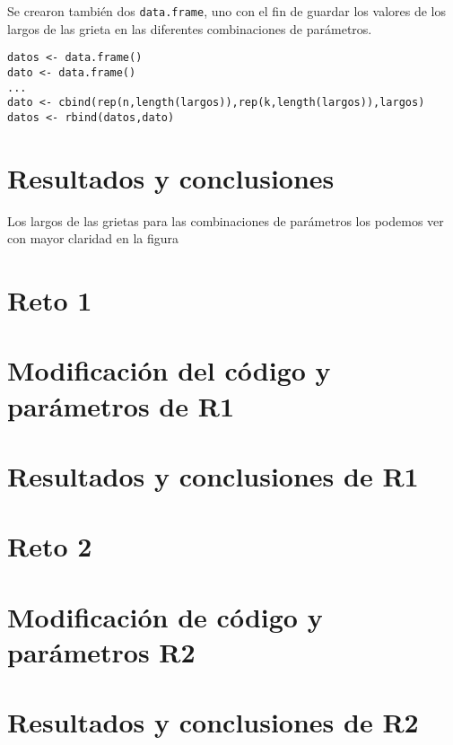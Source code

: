 \documentclass[a4paper]{article}
\begin{document}
Se crearon también dos \texttt{data.frame}, uno con el fin de guardar los valores de los largos de las grieta en las diferentes combinaciones de parámetros.
\begin{lstlisting}[frame=single]
datos <- data.frame()
dato <- data.frame()
...
dato <- cbind(rep(n,length(largos)),rep(k,length(largos)),largos)
datos <- rbind(datos,dato)
\end{lstlisting}

\section{Resultados y conclusiones}
Los largos de las grietas para las combinaciones de parámetros los podemos ver con mayor claridad en la figura 


\section{Reto 1}


\section{Modificación del código y parámetros de R1}



\section{Resultados y conclusiones de R1}

\section{Reto 2}


\section{Modificación de código y parámetros R2}

\section{Resultados y conclusiones de R2}
\end{document}
